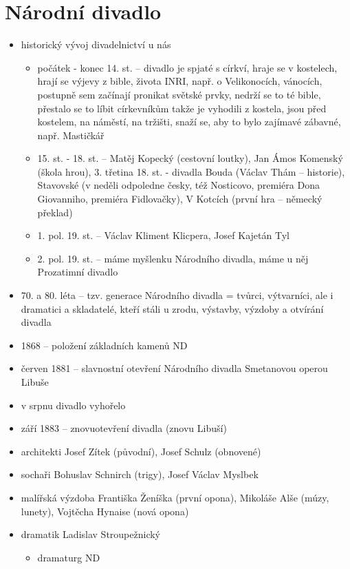 \documentclass{article}
\begin{document}
\part{Národní divadlo}
\begin{itemize}
  \item historický vývoj divadelnictví u nás
  \begin{itemize}
    \item počátek - konec 14. st. -- divadlo je spjaté s církví, hraje se v kostelech, hrají se výjevy z bible, života INRI, např. o Velikonocích, vánocích, postupně sem začínají pronikat světské prvky, nedrží se to té bible, přestalo se to líbit církevníkům takže je vyhodili z kostela, jsou před kostelem, na náměstí, na tržišti, snaží se, aby to bylo zajímavé zábavné, např. Mastičkář
    \item 15. st. - 18. st. -- Matěj Kopecký (cestovní loutky), Jan Ámos Komenský (škola hrou), 3. třetina 18. st. - divadla Bouda (Václav Thám -- historie), Stavovské (v neděli odpoledne česky, též Nosticovo, premiéra Dona Giovanniho, premiéra Fidlovačky), V Kotcích (první hra  -- německý překlad)
    \item 1. pol. 19. st. -- Václav Kliment Klicpera, Josef Kajetán Tyl
    \item 2. pol. 19. st. -- máme myšlenku Národního divadla, máme u něj Prozatimní divadlo
  \end{itemize}
  \item 70. a 80. léta -- tzv. generace Národního divadla = tvůrci, výtvarníci, ale i dramatici a skladatelé, kteří stáli u zrodu, výstavby, výzdoby a otvírání divadla
  \item 1868 -- položení základních kamenů ND
  \item červen 1881 -- slavnostní otevření Národního divadla Smetanovou operou Libuše
  \item v srpnu divadlo vyhořelo
  \item září 1883 -- znovuotevření divadla (znovu Libuší)
  \item architekti Josef Zítek (původní), Josef Schulz (obnovené)
  \item sochaři Bohuslav Schnirch (trigy), Josef Václav Myslbek
  \item malířská výzdoba Františka Ženíška (první opona), Mikoláše Alše (múzy, lunety), Vojtěcha Hynaise (nová opona)
  \item dramatik Ladislav Stroupežnický
  \begin{itemize}
    \item dramaturg ND

\end{itemize}
\end{itemize}
\end{document}
